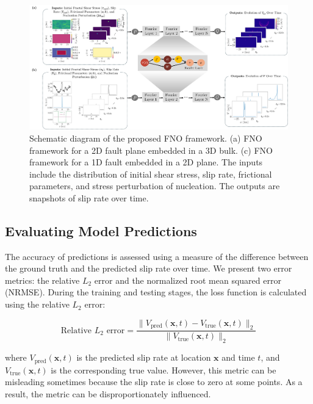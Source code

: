 \documentclass[draft]{agujournal2019}
\begin{document}
\begin{figure}
\centering
\includegraphics[width=1.0\linewidth]{fno_framework.png}
\caption{\label{fig:schematic_FNO}Schematic diagram of the proposed FNO framework. (a) FNO framework for a 2D fault plane embedded in a 3D bulk. (c) FNO framework for a 1D fault embedded in a 2D plane. The inputs include the distribution of initial shear stress, slip rate, frictional parameters, and stress perturbation of nucleation. The outputs are snapshots of slip rate over time.
}
\end{figure}

\subsection{Evaluating Model Predictions}
\label{sec:eval}

The accuracy of predictions is assessed using a measure of the difference between the ground truth and the predicted slip rate over time. We present two error metrics: the relative \(L_2\) error and the normalized root mean squared error (NRMSE). During the training and testing stages, the loss function is calculated using the relative \(L_2\) error:

\begin{equation}
\label{eqn:rel_l2}
\text{Relative } L_2 \text{ error} = \frac{\| V_{\text{pred}}(\mathbf{x}, t) - V_{\text{true}}(\mathbf{x}, t) \|_2}{\| V_{\text{true}}(\mathbf{x}, t) \|_2}
\end{equation}

where \(V_{\text{pred}}(\mathbf{x}, t)\) is the predicted slip rate at location \(\mathbf{x}\) and time \(t\), and \(V_{\text{true}}(\mathbf{x}, t)\) is the corresponding true value. However, this metric can be misleading sometimes because the slip rate is close to zero at some points. As a result, the metric can be disproportionately influenced. 
\end{document}
